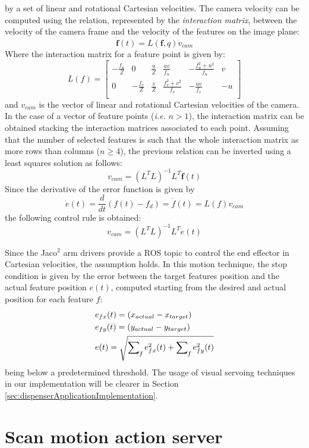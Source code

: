 by a set of linear and rotational Cartesian velocities.
The camera velocity can be computed using the relation, represented by the
\textit{interaction matrix}, between the velocity of the camera frame and the velocity of the features on the image plane:
\[
\dot{\boldsymbol{f}}(t) = L(\boldsymbol{f},q)v_{cam}
\]
Where the interaction matrix for a feature point is given by:
\[
L(f)=
\begin{bmatrix}
-\frac{f_u}{Z}	& 0 				& \frac{u}{Z}	& \frac{uv}{f_u} 		& -\frac{f_u^2+u^2}{f_u} & v \\
0			& -\frac{f_v}{Z}	& \frac{v}{Z}	& \frac{f_v^2+v^2}{f_v} &  -\frac{uv}{f_v} & -u\\
\end{bmatrix}
\]
and $v_{cam}$ is the vector of linear and rotational Cartesian velocities of the camera. In the case of a vector of feature points (\textit{i.e.} $n>1$), the interaction matrix can be obtained stacking the interaction matrices associated to each point.
Assuming that the number of selected features is such that the whole interaction matrix as
more rows than columns ($n\geq4$), the previous relation can be inverted using a least squares solution as follows:
\begin{equation}\label{eq:velCameraVisServo}
	v_{cam}=(L^TL)^{-1}L^T\dot{\boldsymbol{f}}(t)
\end{equation}
Since the derivative of the error function is given by 
\[
	\dot{e}(t)=\frac{d}{dt}(f(t)-f_d) = \dot{f}(t) = L(f)v_{cam}
\]
the following control rule is obtained:
\[
v_{cam}=(L^TL)^{-1}L^T\dot{e}(t)
\]

Since the Jaco$^2$ arm drivers provide a \ac{ROS} topic to control the end effector in Cartesian velocities, the assumption holds. In this motion technique, the stop condition is given by the error between the target features position and the actual feature position $e(t)$, computed starting from the desired and actual position for each feature $f$:
\begin{align*}
	& e_{fx}(t)=(x_{actual} - x_{target}) \\
	& e_{fy}(t)=(y_{actual} - y_{target}) \\
	& e(t)=\sqrt{\sum_{}^{}\mathop{}_{\mkern-5mu f} e_{fx}^2(t) + \sum_{}^{}\mathop{}_{\mkern-5mu f} e_{fy}^2(t)}
\end{align*}
being below a predetermined threshold.
The usage of visual servoing techniques in our implementation will be clearer in Section \ref{sec:dispenserApplicationImplementation}.

\section{Scan motion action server}\label{sec:scanMotionActionServer}

